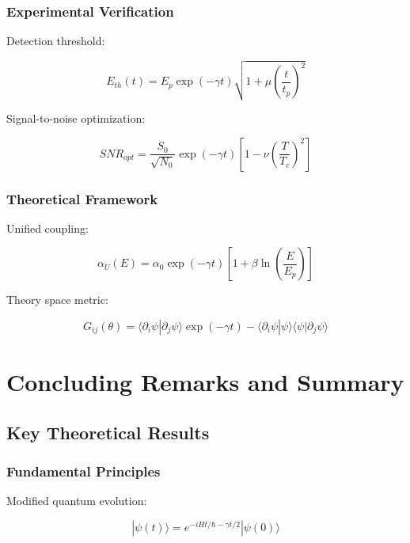 \documentclass[12pt]{article}
\theoremstyle{plain}
\theoremstyle{definition}
\theoremstyle{remark}
\begin{document}
\subsubsection{Experimental Verification}

Detection threshold:

\begin{equation}
E_{th}(t) = E_p\exp(-\gamma t)\sqrt{1 + \mu\left(\frac{t}{t_p}\right)^2}
\end{equation}

Signal-to-noise optimization:

\begin{equation}
SNR_{opt} = \frac{S_0}{\sqrt{N_0}}\exp(-\gamma t)\left[1 - \nu\left(\frac{T}{T_c}\right)^2\right]
\end{equation}

\subsubsection{Theoretical Framework}

Unified coupling:

\begin{equation}
\alpha_U(E) = \alpha_0\exp(-\gamma t)\left[1 + \beta\ln\left(\frac{E}{E_p}\right)\right]
\end{equation}

Theory space metric:

\begin{equation}
G_{ij}(\theta) = \langle\partial_i\psi|\partial_j\psi\rangle\exp(-\gamma t) - \langle\partial_i\psi|\psi\rangle\langle\psi|\partial_j\psi\rangle
\end{equation}
\section{Concluding Remarks and Summary}

\subsection{Key Theoretical Results}

\subsubsection{Fundamental Principles}

Modified quantum evolution:

\begin{equation}
|\psi(t)\rangle = e^{-iHt/\hbar-\gamma t/2}|\psi(0)\rangle
\end{equation}
\end{document}

